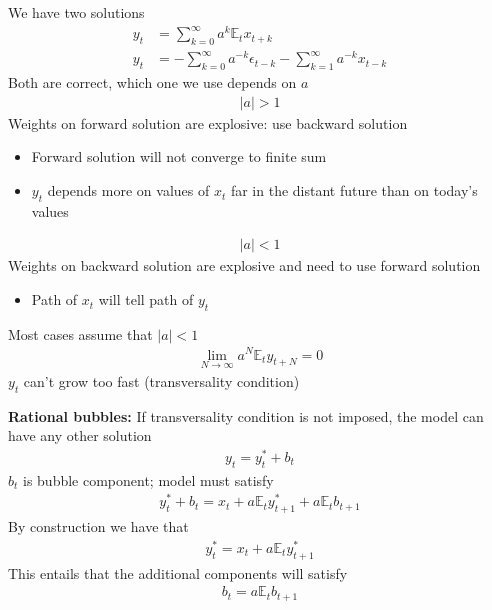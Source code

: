 \documentclass{beamer}
\begin{document}
\begin{frame}
  We have two solutions
  \begin{align}
    y_t &= \sum^\infty_{k=0}a^k\mathbb{E}_tx_{t+k} \\
    y_t&= -\sum^{\infty}_{k=0}a^{-k}\epsilon_{t-k}-\sum^{\infty}_{k=1}a^{-k}x_{t-k}
  \end{align}
  Both are correct, which one we use depends on $a$
  \begin{align}
    |a|>1
  \end{align}
  Weights on forward solution are explosive: use backward solution
  \begin{itemize}
    \item Forward solution will not converge to finite sum
    \item $y_t$ depends more on values of $x_t$ far in the distant future than on today's values
  \end{itemize}  
\end{frame}

\begin{frame} 
  \begin{align}
    |a|<1
  \end{align}
  Weights on backward solution are explosive and need to use forward solution
  \begin{itemize}
    \item Path of $x_t$ will tell path of $y_t$
  \end{itemize}
  Most cases assume that $|a|<1$
  \begin{align}
    \lim_{N \rightarrow \infty} a^N \mathbb{E}_t y_{t+N} = 0
  \end{align}
   $y_t$ can't grow too fast (transversality condition)
\end{frame}

\begin{frame}
  \textbf{Rational bubbles:} If transversality condition is not imposed, the model can have any other solution
  \begin{align}
    y_t = y_t^* + b_t
  \end{align}
$b_t$ is bubble component; model must satisfy
\begin{align}
  y_t^* + b_t = x_t + a\mathbb{E}_t y^*_{t+1} + a\mathbb{E}_tb_{t+1} 
\end{align}
By construction we have that
\begin{align}
  y_t^* = x_t + a\mathbb{E}_t y^*_{t+1}
\end{align}
This entails that the additional components will satisfy
\begin{align}
  b_t = a\mathbb{E}_tb_{t+1} 
\end{align}
\end{frame}
\end{document}

